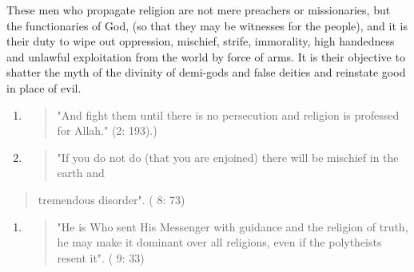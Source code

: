 These men who propagate religion are not mere preachers or missionaries,
but the functionaries of God, (so that they may be witnesses for the
people), and it is their duty to wipe out oppression, mischief, strife,
immorality, high handedness and unlawful exploitation from the world by
force of arms. It is their objective to shatter the myth of the divinity
of demi-gods and false deities and reinstate good in place of evil.

\begin{enumerate}
\def\labelenumi{(\arabic{enumi})}
\item
  \begin{quote}
  "And fight them until there is no persecution and religion is
  professed for Allah." (2: 193).)
  \end{quote}
\item
  \begin{quote}
  "If you do not do (that you are enjoined) there will be mischief in
  the earth and
  \end{quote}
\end{enumerate}

\begin{quote}
tremendous disorder". ( 8: 73)
\end{quote}

\begin{enumerate}
\def\labelenumi{(\arabic{enumi})}
\setcounter{enumi}{2}
\item
  \begin{quote}
  "He is Who sent His Messenger with guidance and the religion of truth,
  he may make it dominant over all religions, even if the polytheists
  resent it". ( 9: 33)
  \end{quote}
\end{enumerate}

